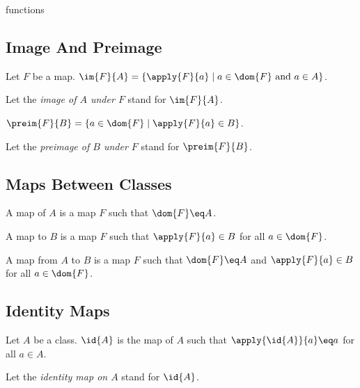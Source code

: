 \documentclass{article}
\begin{document}
\begin{smodule}{functions}
\subsection{Image And Preimage}

\begin{definition*}[forthel,id=ImageDef,printid]
  Let $F$ be a map.
  $\im{F}{A}=\{\apply{F}{a}\mid a\in\dom{F}\text{ and }a\in A\}$.

  Let the \emph{image of $A$ under $F$} stand for $\im{F}{A}$.
\end{definition*}

\begin{definition*}[forthel,id=PreimageDef,printid]
  $\preim{F}{B}=\{a\in\dom{F}\mid \apply{F}{a}\in B\}$.

  Let the \emph{preimage of $B$ under $F$} stand for $\preim{F}{B}$.
\end{definition*}


\subsection{Maps Between Classes}

\begin{definition*}[forthel,id=MapFromDef,printid]
  A map of $A$ is a map $F$ such that $\dom{F}\eq A$.
\end{definition*}

\begin{definition*}[forthel,id=MapToDef,printid]
  A map to $B$ is a map $F$ such that $\apply{F}{a}\in B$ for all $a\in\dom{F}$.
\end{definition*}

\begin{definition*}[forthel,id=MapFromToDef,printid]
  A map from $A$ to $B$ is a map $F$ such that $\dom{F}\eq A$ and $\apply{F}{a}\in B$ for all $a\in\dom{F}$.
\end{definition*}


\subsection{Identity Maps}

\begin{definition*}[forthel,id=IdentityMapDef,printid]
  Let $A$ be a class.
  $\id{A}$ is the map of $A$ such that $\apply{\id{A}}{a}\eq a$ for all $a\in A$.

  Let the \emph{identity map on $A$} stand for $\id{A}$.
\end{definition*}



\end{smodule}
\end{document}
